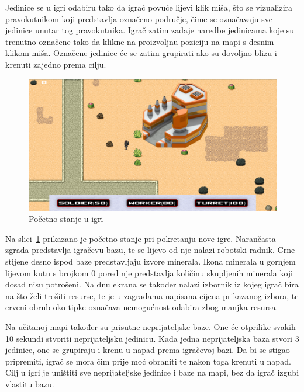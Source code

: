 \documentclass[times, utf8, zavrsni, numeric]{fer}
\begin{document}
\par Jedinice se u igri odabiru tako da igrač povuče lijevi klik miša, što se vizualizira pravokutnikom koji predstavlja označeno područje, čime se označavaju sve jedinice unutar tog pravokutnika.
Igrač zatim zadaje naredbe jedinicama koje su trenutno označene tako da klikne na proizvoljnu poziciju na mapi s desnim klikom miša.
Označene jedinice će se zatim grupirati ako su dovoljno blizu i krenuti zajedno prema cilju.

\begin{figure}[h]
	\centering
	\includegraphics[width=0.9\linewidth]{images/gameStartScreenshot.png}
	\caption{Početno stanje u igri}
	\label{fig:gameStart}
\end{figure}

\par Na slici~\ref{fig:gameStart} prikazano je početno stanje pri pokretanju nove igre.
Narančasta zgrada predstavlja igračevu bazu, te se lijevo od nje nalazi robotski radnik.
Crne stijene desno ispod baze predstavljaju izvore minerala.
Ikona minerala u gornjem lijevom kutu s brojkom 0 pored nje predstavlja količinu skupljenih minerala koji dosad nisu potrošeni.
Na dnu ekrana se također nalazi izbornik iz kojeg igrač bira na što želi trošiti resurse, te je u zagradama napisana cijena prikazanog izbora, te crveni obrub oko tipke označava nemogućnost odabira zbog manjka resursa.

\par Na učitanoj mapi također su prisutne neprijateljske baze.
One će otprilike svakih 10 sekundi stvoriti neprijateljsku jedinicu.
Kada jedna neprijateljska baza stvori 3 jedinice, one se grupiraju i krenu u napad prema igračevoj bazi.
Da bi se stigao pripremiti, igrač se mora čim prije moć obraniti te nakon toga krenuti u napad.
Cilj u igri je uništiti sve neprijateljske jedinice i baze na mapi, bez da igrač izgubi vlastitu bazu. 
\end{document}
